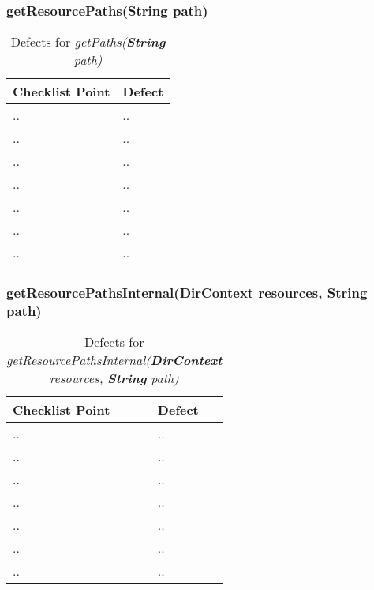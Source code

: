 \subsubsection{getResourcePaths(String path)}
\begin{table}[htbp]
\begin{center}
\begin{tabular}[t]{p{}p{}}

\hline
\textbf{Checklist Point} & \textbf{Defect} \\
\hline
.. & .. \\
\hline
.. & .. \\
\hline
.. & .. \\
\hline
.. & .. \\
\hline
.. & .. \\
\hline
.. & .. \\
\hline
.. & .. \\
\hline

\end{tabular}
\end{center}
\caption{Defects for \textit{getPaths(\textbf{String} path)}}
\end{table}
\clearpage

\subsubsection{getResourcePathsInternal(DirContext resources, String path)}
\begin{table}[htbp]
\begin{center}
\begin{tabular}[t]{p{}p{}}

\hline
\textbf{Checklist Point} & \textbf{Defect} \\
\hline
.. & .. \\
\hline
.. & .. \\
\hline
.. & .. \\
\hline
.. & .. \\
\hline
.. & .. \\
\hline
.. & .. \\
\hline
.. & .. \\
\hline

\end{tabular}
\end{center}
\caption{Defects for \textit{getResourcePathsInternal(\textbf{DirContext} resources, \textbf{String} path)}}
\end{table}
\clearpage

